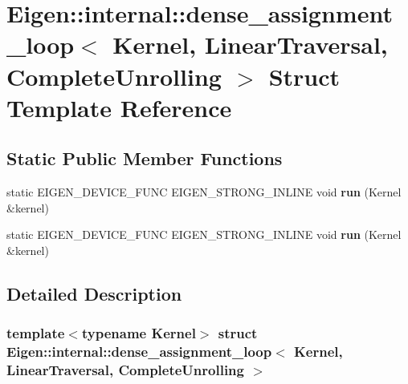 \hypertarget{struct_eigen_1_1internal_1_1dense__assignment__loop_3_01_kernel_00_01_linear_traversal_00_01_complete_unrolling_01_4}{}\section{Eigen\+:\+:internal\+:\+:dense\+\_\+assignment\+\_\+loop$<$ Kernel, Linear\+Traversal, Complete\+Unrolling $>$ Struct Template Reference}
\label{struct_eigen_1_1internal_1_1dense__assignment__loop_3_01_kernel_00_01_linear_traversal_00_01_complete_unrolling_01_4}
\subsection*{Static Public Member Functions}
\begin{DoxyCompactItemize}
\item 
\mbox{\label{struct_eigen_1_1internal_1_1dense__assignment__loop_3_01_kernel_00_01_linear_traversal_00_01_complete_unrolling_01_4_a57fe1a0c9f007a8da12440489e46159a}} 
static E\+I\+G\+E\+N\+\_\+\+D\+E\+V\+I\+C\+E\+\_\+\+F\+U\+NC E\+I\+G\+E\+N\+\_\+\+S\+T\+R\+O\+N\+G\+\_\+\+I\+N\+L\+I\+NE void {\bfseries run} (Kernel \&kernel)
\item 
\mbox{\label{struct_eigen_1_1internal_1_1dense__assignment__loop_3_01_kernel_00_01_linear_traversal_00_01_complete_unrolling_01_4_a57fe1a0c9f007a8da12440489e46159a}} 
static E\+I\+G\+E\+N\+\_\+\+D\+E\+V\+I\+C\+E\+\_\+\+F\+U\+NC E\+I\+G\+E\+N\+\_\+\+S\+T\+R\+O\+N\+G\+\_\+\+I\+N\+L\+I\+NE void {\bfseries run} (Kernel \&kernel)
\end{DoxyCompactItemize}


\subsection{Detailed Description}
\subsubsection*{template$<$typename Kernel$>$\newline
struct Eigen\+::internal\+::dense\+\_\+assignment\+\_\+loop$<$ Kernel, Linear\+Traversal, Complete\+Unrolling $>$}



